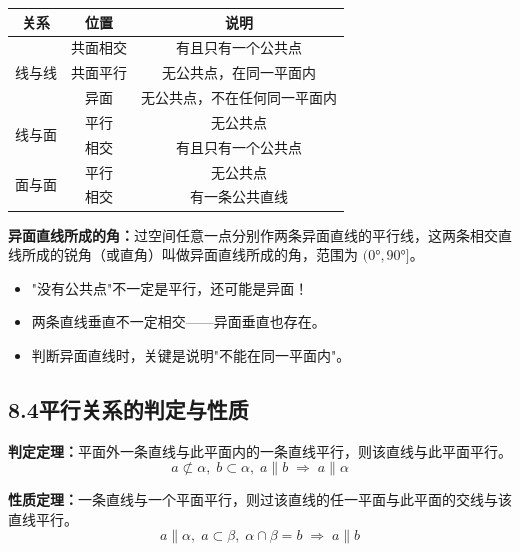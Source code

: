 \documentclass[12pt, a4paper]{ctexart}
\begin{document}
\begin{knowledgebox}
\begin{center}
\renewcommand{\arraystretch}{1.3}
\begin{tabular}{|c|c|c|}
\hline
\textbf{关系} & \textbf{位置} & \textbf{说明} \\
\hline
\multirow{3}{*}{线与线} & 共面相交 & 有且只有一个公共点 \\
\cline{2-3}
 & 共面平行 & 无公共点，在同一平面内 \\
\cline{2-3}
 & 异面 & 无公共点，不在任何同一平面内 \\
\hline
\multirow{2}{*}{线与面} & 平行 & 无公共点 \\
\cline{2-3}
 & 相交 & 有且只有一个公共点 \\
\hline
\multirow{2}{*}{面与面} & 平行 & 无公共点 \\
\cline{2-3}
 & 相交 & 有一条公共直线 \\
\hline
\end{tabular}
\end{center}

\textbf{异面直线所成的角：}过空间任意一点分别作两条异面直线的平行线，这两条相交直线所成的锐角（或直角）叫做异面直线所成的角，范围为 $(0°, 90°]$。
\end{knowledgebox}

\begin{warnbox}[易错提醒]
\begin{itemize}[leftmargin=2em]
  \item "没有公共点"不一定是平行，还可能是异面！
  \item 两条直线垂直不一定相交——异面垂直也存在。
  \item 判断异面直线时，关键是说明"不能在同一平面内"。
\end{itemize}
\end{warnbox}

\subsection*{8.4\quad 平行关系的判定与性质}

\begin{knowledgebox}[【知识8】线面平行]
\textbf{判定定理：}平面外一条直线与此平面内的一条直线平行，则该直线与此平面平行。
\[\boxed{a \not\subset \alpha,\; b \subset \alpha,\; a \parallel b \;\Longrightarrow\; a \parallel \alpha}\]

\textbf{性质定理：}一条直线与一个平面平行，则过该直线的任一平面与此平面的交线与该直线平行。
\[\boxed{a \parallel \alpha,\; a \subset \beta,\; \alpha \cap \beta = b \;\Longrightarrow\; a \parallel b}\]
\end{knowledgebox}
\end{document}
